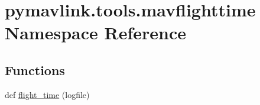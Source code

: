 \hypertarget{namespacepymavlink_1_1tools_1_1mavflighttime}{}\section{pymavlink.\+tools.\+mavflighttime Namespace Reference}
\label{namespacepymavlink_1_1tools_1_1mavflighttime}
\subsection*{Functions}
\begin{DoxyCompactItemize}
\item 
def \hyperlink{namespacepymavlink_1_1tools_1_1mavflighttime_a20110edf75eca397a2929bc07ce011ca}{flight\+\_\+time} (logfile)
\end{DoxyCompactItemize}
